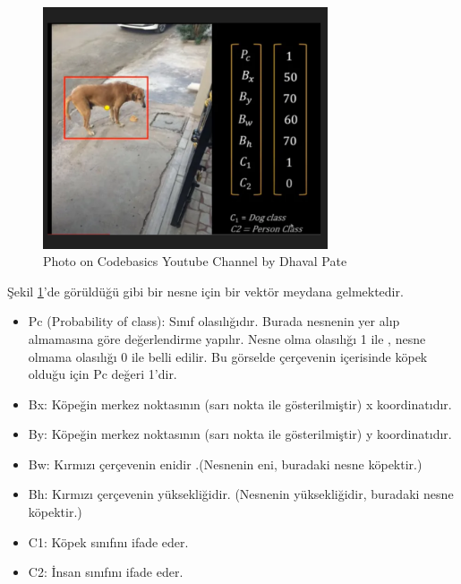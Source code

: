 \documentclass[11pt,a4paper]{report}
\begin{document}
    \begin{figure}[!h]
    	\centering
    	\includegraphics[width=0.75\textwidth]{matris}
    	\caption{Photo on Codebasics Youtube Channel by Dhaval Pate}
    	\label{fig:ornek}
    \end{figure}
    Şekil \ref{fig:ornek}'de görüldüğü gibi bir nesne için bir vektör meydana gelmektedir.
    
    
    \begin{itemize}
    	\item Pc (Probability of class): Sınıf olasılığıdır. Burada nesnenin yer alıp almamasına göre değerlendirme yapılır. Nesne olma olasılığı 1 ile , nesne olmama olasılığı 0 ile belli edilir. Bu görselde çerçevenin içerisinde köpek olduğu için Pc değeri 1'dir.
    	
    	\item  Bx: Köpeğin merkez noktasının (sarı nokta ile gösterilmiştir) x koordinatıdır.
    	
    	\item  By: Köpeğin merkez noktasının (sarı nokta ile gösterilmiştir) y koordinatıdır.
    	
    	\item  Bw: Kırmızı çerçevenin enidir .(Nesnenin eni, buradaki nesne köpektir.)
    	
    	\item Bh: Kırmızı çerçevenin yüksekliğidir. (Nesnenin yüksekliğidir, buradaki nesne köpektir.)
    	
    	\item  C1: Köpek sınıfını ifade eder.
    	
    	\item  C2: İnsan sınıfını ifade eder.
    	
    \end{itemize}
    
\end{document}
